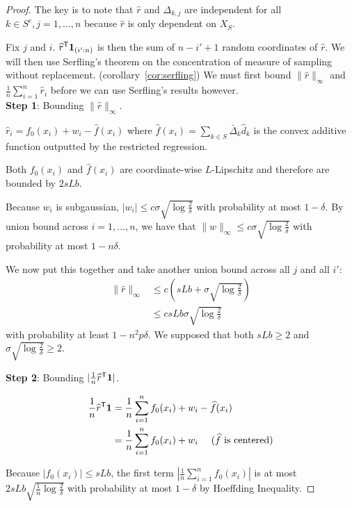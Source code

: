 \begin{proof}
The key is to note that $\hat{r}$ and $\Delta_{k,j}$ are independent for all $k \in S^c,j=1,...,n$ because $\hat{r}$ is only dependent on $X_{S}$.

Fix $j$ and $i$. $\widehat{r}^{\mathsf{T}} \mbox{\boldmath $1$}_{(i':n)}$ is then the sum of $n-i'+1$ random coordinates of $\hat{r}$. We will then use Serfling's theorem on the concentration of measure of sampling without replacement. (corollary~\ref{cor:serfling}) We must first bound $\| \hat{r} \|_\infty$ and $\frac{1}{n} \sum_{i=1}^n \hat{r}_i$ before we can use Serfling's results however.\\

\textbf{Step 1}: Bounding $\| \hat{r} \|_\infty$. 

$\hat{r}_i = f_0(x_i) + w_i - \hat{f}(x_i)$ where $\hat{f}(x_i) = \sum_{k \in S} \bar{\Delta}_k \hat{d}_k$ is the convex additive function outputted by the restricted regression.

Both $f_0(x_i)$ and $\hat{f}(x_i)$ are coordinate-wise $L$-Lipschitz and therefore are bounded by $2 sLb$. 

Because $w_i$ is subgaussian, $|w_i| \leq c \sigma \sqrt{\log \frac{2}{\delta}}$ with probability at most $1-\delta$. By union bound across $i=1,...,n$, we have that $\| w\|_\infty \leq c \sigma \sqrt{ \log \frac{2}{\delta}}$ with probability at most $1 - n \delta$.

We now put this together and take another union bound across all $j$ and all $i'$:
\begin{align*}
\| \hat{r} \|_\infty &\leq c (sLb + \sigma \sqrt{ \log \frac{2}{\delta}}) \\
      &\leq c sLb \sigma \sqrt{\log \frac{2}{\delta}}
\end{align*}
with probability at least $1 - n^2 p \delta$. We supposed that both $sLb \geq 2$ and $\sigma\sqrt{\log \frac{2}{\delta}} \geq 2$.

\textbf{Step 2}: Bounding $| \frac{1}{n} \widehat{r}^{\mathsf{T}} \mbox{\boldmath $1$} |$. 

\begin{align*}
\frac{1}{n} \widehat{r}^{\mathsf{T}} \mbox{\boldmath $1$} &= 
    \frac{1}{n} \sum_{i=1}^n f_0(x_i) + w_i - \widehat{f}(x_i) \\
  &= \frac{1}{n} \sum_{i=1}^n f_0(x_i) + w_i \quad \textrm{ ($\widehat{f}$ is centered)}
\end{align*}

Because $|f_0(x_i)| \leq sLb$, the first term $| \frac{1}{n} \sum_{i=1}^n f_0(x_i)|$ is at most $2 sLb \sqrt{\frac{1}{n} \log \frac{2}{\delta}}$ with probability at most $1-\delta$ by Hoeffding Inequality.


\end{proof}
